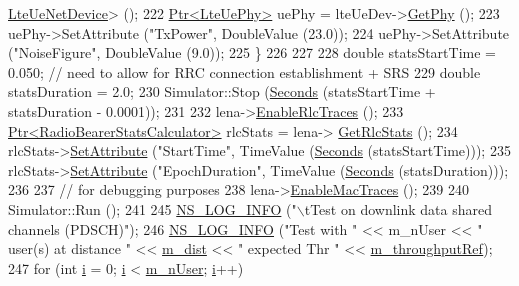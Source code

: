 \begin{DoxyCode}
      \hyperlink{classns3_1_1LteUeNetDevice}{LteUeNetDevice}> ();
222       \hyperlink{classns3_1_1Ptr}{Ptr<LteUePhy>} uePhy = lteUeDev->\hyperlink{classns3_1_1LteUeNetDevice_a2a9940a1e457a8bf3dae87fed4199c7a}{GetPhy} ();
223       uePhy->SetAttribute (\textcolor{stringliteral}{"TxPower"}, DoubleValue (23.0));
224       uePhy->SetAttribute (\textcolor{stringliteral}{"NoiseFigure"}, DoubleValue (9.0));
225     \}
226 
227 
228   \textcolor{keywordtype}{double} statsStartTime = 0.050; \textcolor{comment}{// need to allow for RRC connection establishment + SRS }
229   \textcolor{keywordtype}{double} statsDuration = 2.0;
230   Simulator::Stop (\hyperlink{group__timecivil_ga33c34b816f8ff6628e33d5c8e9713b9e}{Seconds} (statsStartTime + statsDuration - 0.0001));
231 
232   lena->\hyperlink{classns3_1_1LteHelper_abadfdd04d30b261e9b6f0846b4784928}{EnableRlcTraces} ();
233   \hyperlink{classns3_1_1Ptr}{Ptr<RadioBearerStatsCalculator>} rlcStats = lena->
      \hyperlink{classns3_1_1LteHelper_a6eb438ccf69642e3863adea4991fa2ca}{GetRlcStats} ();
234   rlcStats->\hyperlink{classns3_1_1ObjectBase_ac60245d3ea4123bbc9b1d391f1f6592f}{SetAttribute} (\textcolor{stringliteral}{"StartTime"}, TimeValue (\hyperlink{group__timecivil_ga33c34b816f8ff6628e33d5c8e9713b9e}{Seconds} (statsStartTime)));
235   rlcStats->\hyperlink{classns3_1_1ObjectBase_ac60245d3ea4123bbc9b1d391f1f6592f}{SetAttribute} (\textcolor{stringliteral}{"EpochDuration"}, TimeValue (\hyperlink{group__timecivil_ga33c34b816f8ff6628e33d5c8e9713b9e}{Seconds} (statsDuration)));
236 
237   \textcolor{comment}{// for debugging purposes}
238   lena->\hyperlink{classns3_1_1LteHelper_affa3a12841520407d3662417fe41863d}{EnableMacTraces} ();
239 
240   Simulator::Run ();
241 
245   \hyperlink{group__logging_gafbd73ee2cf9f26b319f49086d8e860fb}{NS\_LOG\_INFO} (\textcolor{stringliteral}{"\(\backslash\)tTest on downlink data shared channels (PDSCH)"});
246   \hyperlink{group__logging_gafbd73ee2cf9f26b319f49086d8e860fb}{NS\_LOG\_INFO} (\textcolor{stringliteral}{"Test with "} << m\_nUser << \textcolor{stringliteral}{" user(s) at distance "} << 
      \hyperlink{classLenaHarqTestCase_a5663ec9ff3b57db57555bedee9b6544c}{m\_dist} << \textcolor{stringliteral}{" expected Thr "} << \hyperlink{classLenaHarqTestCase_a041c5b33791e34cdfa46c79235f6ac77}{m\_throughputRef});
247   \textcolor{keywordflow}{for} (\textcolor{keywordtype}{int} \hyperlink{bernuolliDistribution_8m_a6f6ccfcf58b31cb6412107d9d5281426}{i} = 0; \hyperlink{bernuolliDistribution_8m_a6f6ccfcf58b31cb6412107d9d5281426}{i} < \hyperlink{classLenaHarqTestCase_a63345f1ba9ffc5ab5e8a01ca79d6f0c4}{m\_nUser}; \hyperlink{bernuolliDistribution_8m_a6f6ccfcf58b31cb6412107d9d5281426}{i}++)

\end{DoxyCode}
